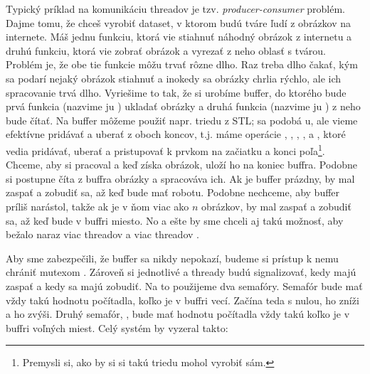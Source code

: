 Typický príklad na komunikáciu threadov je  tzv. {\em producer-consumer} problém. 
Dajme tomu, že chceš vyrobiť dataset, v ktorom budú tváre ľudí z obrázkov na internete.
Máš jednu funkciu, ktorá vie stiahnuť náhodný obrázok z internetu a druhú funkciu, ktorá vie zobrať obrázok a vyrezať z neho oblasť s tvárou.
Problém je, že obe tie funkcie môžu trvať rôzne dlho. Raz treba dlho čakať, kým sa podarí nejaký obrázok stiahnuť a inokedy sa obrázky
chrlia rýchlo, ale ich spracovanie trvá dlho. Vyriešime to tak, že si urobíme buffer, do ktorého bude prvá funkcia (nazvime ju )
ukladať obrázky a druhá funkcia (nazvime ju ) z neho bude čítať. Na buffer môžeme použiť  napr. triedu  z STL; 
sa podobá u, ale vieme efektívne pridávať a uberať z oboch koncov, t.j. máme
operácie , , , ,  a ,
ktoré vedia pridávať, uberať a pristupovať k prvkom na začiatku a konci poľa\footnote{Premysli si, ako by si si takú triedu mohol vyrobiť sám.}. 
Chceme, aby si  pracoval a keď získa obrázok, 
uloží ho na koniec buffra. Podobne  si postupne číta z buffra obrázky a spracováva ich. Ak je buffer prázdny,  by mal
zaspať a zobudiť sa, až keď bude mať robotu. Podobne nechceme, aby buffer príliš narástol, takže ak je v ňom viac ako $n$ obrázkov,
 by mal zaspať a zobudiť sa, až keď bude v buffri miesto. No a ešte by sme chceli aj takú možnosť, aby bežalo naraz viac threadov
 a viac threadov .

Aby sme zabezpečili, že buffer sa nikdy nepokazí, budeme si prístup k nemu chrániť mutexom . Zároveň si jednotlivé  a 
thready budú signalizovať, kedy majú zaspať a kedy sa majú zobudiť. Na to použijeme dva semafóry. Semafór  bude mať vždy takú hodnotu
počítadla, koľko je v buffri vecí. Začína teda s nulou,  ho zníži a  ho zvýši. Druhý semafór, , bude mať hodnotu počítadla
vždy takú koľko je v buffri voľných miest. Celý systém by vyzeral takto:

